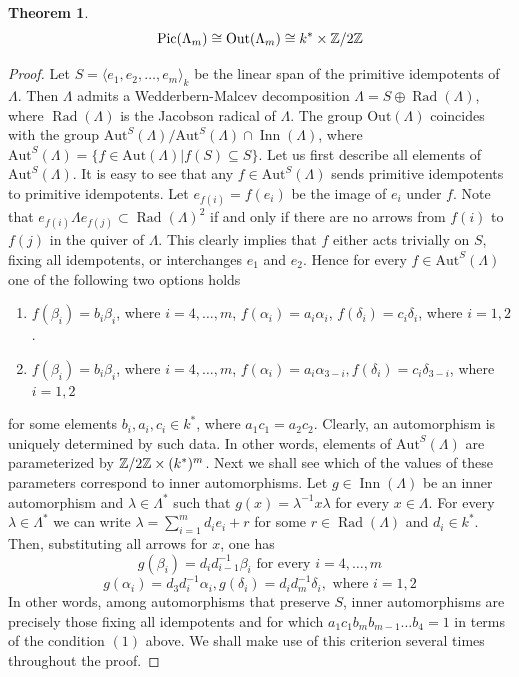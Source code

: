 \documentclass[12pt]{amsart}
\theoremstyle{plain}
\newtheorem{theorem}{Theorem}%
\theoremstyle{remark}
\theoremstyle{definition}
\newcommand{\Aut}{{\mathrm{Aut}}}
\newcommand{\Rad}{\mathop{\mathrm{Rad}}\nolimits}
\newcommand{\Out}{{\mathrm{Out}}}
\newcommand{\Inn}{\mathop{\mathrm{Inn}}\nolimits}
\newcommand{\Pic}{{\mathrm{Pic}}}
\begin{document}
\begin{theorem}\label{thm:pic} $$\Pic(\Lambda_m) \cong \Out(\Lambda_m) \cong k^* \times  \Z/2\Z$$
 \end{theorem}
  \begin{proof} Let $S = \langle e_1, e_2, \dots, e_m \rangle_k $ be the linear span of the primitive idempotents of $\Lambda$. Then $\Lambda$ admits a Wedderbern-Malcev decomposition ${\Lambda = S \oplus \Rad(\Lambda)}$, where $\Rad(\Lambda)$ is the Jacobson radical of $\Lambda$. The group $\Out(\Lambda)$ coincides with the group $\Aut^S(\Lambda)/\Aut^S(\Lambda)\cap \Inn(\Lambda)$, where ${\Aut^S(\Lambda) = \{ f \in \Aut(\Lambda) | f(S) \subseteq S \} }$. Let us first describe all elements of $\Aut^S(\Lambda)$. It is easy to see that any $f \in \Aut^S(\Lambda)$ sends primitive idempotents to primitive idempotents. Let $e_{f(i)} = f(e_i)$ be the image of $e_i$ under $f$. Note that $e_{f(i)}\Lambda e_{f(j)} \subset \Rad(\Lambda)^2$ if and only if there are no arrows from $f(i)$ to $f(j)$ in the quiver of $\Lambda$. This clearly implies that $f$ either acts trivially on $S$, fixing all idempotents, or interchanges $e_1$ and $e_2$. Hence for every $f \in \Aut^S(\Lambda)$ one of the following two options holds
  
  \begin{enumerate}
      \item[(1)] $f(\beta_i) = b_i \beta_i$, where $i = 4, \dots, m$, $f(\alpha_i) = a_i \alpha_i$, $f(\delta_i) = c_i \delta_i$, where $i = 1,2$. 
      
      \item[(2)] $f(\beta_i) = b_i \beta_i$, where $i = 4, \dots, m$, $f(\alpha_i) = a_i \alpha_{3-i}, f(\delta_i) = c_i \delta_{3-i}$, where $i = 1,2$
  \end{enumerate}
    
  \noindent for some elements $b_i, a_i, c_i \in k^*$, where $a_1c_1 = a_2c_2$. Clearly, an automorphism is uniquely determined by such data. In other words, elements of $\Aut^S(\Lambda)$ are parameterized by  $\mathbb Z/2\mathbb Z \times (k^*)^{m}$. Next we shall see which of the values of these parameters correspond to inner automorphisms. Let $g \in \Inn(\Lambda)$ be an inner automorphism and $\lambda \in \Lambda^*$ such that $g(x) = \lambda^{-1}x\lambda$ for every $x \in \Lambda$. For every $\lambda \in \Lambda^*$ we can write $\lambda = \sum_{i=1}^m d_i e_i + r$ for some $r \in \Rad(\Lambda)$ and $d_i \in k^*$. Then, substituting all arrows for $x$, one has 
  $$g(\beta_i) = d_id_{i-1}^{-1}\beta_i \text{ for every } i = 4, \dots, m $$ 
  $$g(\alpha_i) = d_3d_i^{-1} \alpha_i, g(\delta_i) = d_id_m^{-1} \delta_i, \text{ where } i = 1,2$$
  In other words, among automorphisms that preserve $S$, inner automorphisms are precisely those fixing all idempotents and for which $a_1c_1b_mb_{m-1}\dots b_4 = 1$ in terms of the condition $(1)$ above. We shall make use of this criterion several times throughout the proof. 
  


\end{proof}
\end{document}
